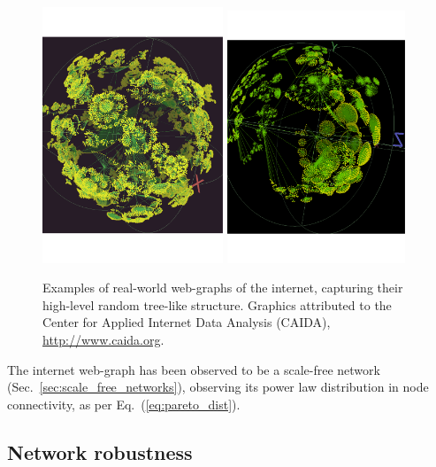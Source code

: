 	\begin{figure}[!htbp]
	\includegraphics[clip=true, width=0.481\textwidth]{webgraph_1}
	\includegraphics[clip=true, width=0.475\textwidth]{webgraph_2}
	\captionspacefig \caption{Examples of real-world web-graphs of the internet, capturing their high-level random tree-like structure. Graphics attributed to the Center for Applied Internet Data Analysis (CAIDA), \url{http://www.caida.org}.} \label{fig:webgraph}
	\end{figure}
\fi

The internet web-graph has been observed to be a scale-free network (Sec.~\ref{sec:scale_free_networks}), observing its power law distribution in node connectivity, as per Eq.~(\ref{eq:pareto_dist}).

%
%

\subsection{Network robustness}

